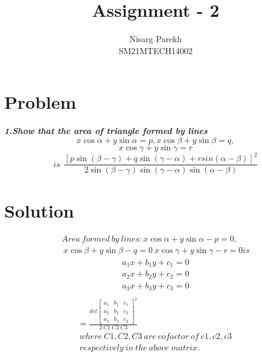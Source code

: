 \documentclass[journal,12pt,twocolumn]{IEEEtran}
\begin{document}
\providecommand{\sbrak}[1]{\ensuremath{{}\left[#1\right]}}
\providecommand{\lsbrak}[1]{\ensuremath{{}\left[#1\right.}}
\providecommand{\rsbrak}[1]{\ensuremath{{}\left.#1\right]}}
\providecommand{\brak}[1]{\ensuremath{\left(#1\right)}}
\providecommand{\lbrak}[1]{\ensuremath{\left(#1\right.}}
\providecommand{\rbrak}[1]{\ensuremath{\left.#1\right)}}
\providecommand{\cbrak}[1]{\ensuremath{\left\{#1\right\}}}
\providecommand{\lcbrak}[1]{\ensuremath{\left\{#1\right.}}
\providecommand{\rcbrak}[1]{\ensuremath{\left.#1\right\}}}
\newcommand{\myvec}[1]{\ensuremath{\begin{pmatrix}#1\end{pmatrix}}}
\newcommand{\cmyvec}[1]{\ensuremath{\begin{pmatrix*}[c]#1\end{pmatrix*}}}
\newcommand{\mydet}[1]{\ensuremath{\begin{vmatrix}#1\end{vmatrix}}}
\newcommand{\proj}[2]{\textbf{proj}_{\vec{#1}}\vec{#2}}
\let\StandardTheFigure\thefigure
\let\vec\mathbf

\title{
Assignment - 2
}
\author{ Nisarg Parekh \\SM21MTECH14002}
\maketitle
\newpage
\bigskip

\section*{\textbf{Problem}}
\noindent
\textbf{\textsl{1.Show that the area of triangle formed by lines
$$x\cos\alpha + y\sin\alpha =p,x\cos\beta + y\sin\beta =q,$$$$x\cos\gamma + y\sin\gamma =r$$
 $$is~~\frac{\left[ p\sin(\beta-\gamma) +q\sin(\gamma-\alpha)+r sin(\alpha-\beta)\right]^2 }{2\sin(\beta-\gamma) \sin(\gamma-\alpha)\sin(\alpha-\beta)}$$ 
 }}
\noindent
\section*{\textbf{Solution}}
\noindent
\begin{align*}
 Area ~formed~ by~ lines:   x\cos\alpha + y\sin\alpha -p=0, \\~x\cos\beta + y\sin\beta -q=0~x\cos\gamma + y\sin\gamma -r=0 is 
\end{align*}
\begin{multline*}
     a_{1}x + b_{1}y +c_{1}=0 \\
    a_{2}x + b_{2}y +c_{2}=0 \\
    a_{3}x + b_{3}y +c_{3}=0 \\
\end{multline*}
\begin{multline}
     =\frac{det \begin{bmatrix}a_{1}&b_{1}&c_{1}\\a_{2}&b_{2}&c_{2}\\a_{3}&b_{3}&c_{3}\end{bmatrix}^{2}}{2~C1~C2~C3}\\\
where ~C1,C2,C3~ are~ co factor ~of~ c1,c2,c3 ~\\\ respectively~ in~ the ~above~ matrix.
\end{multline}
\end{document}
